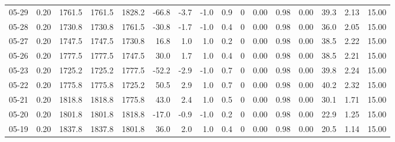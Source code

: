 \begin{threeparttable}
{\begin{tabular}{lrrrrrrrrrrrrrrr}
  05-29 &     0.20 & 1761.5 & 1761.5 & 1828.2 &      -66.8 &           -3.7 &                     -1.0 &                 0.9 &              0 &       0.00 &      0.98 &           0.00 &             39.3 &            2.13 &                  15.00 \\
  05-28 &     0.20 & 1730.8 & 1730.8 & 1761.5 &      -30.8 &           -1.7 &                     -1.0 &                 0.4 &              0 &       0.00 &      0.98 &           0.00 &             36.0 &            2.05 &                  15.00 \\
  05-27 &     0.20 & 1747.5 & 1747.5 & 1730.8 &       16.8 &            1.0 &                      1.0 &                 0.2 &              0 &       0.00 &      0.98 &           0.00 &             38.5 &            2.22 &                  15.00 \\
  05-26 &     0.20 & 1777.5 & 1777.5 & 1747.5 &       30.0 &            1.7 &                      1.0 &                 0.4 &              0 &       0.00 &      0.98 &           0.00 &             38.5 &            2.21 &                  15.00 \\
  05-23 &     0.20 & 1725.2 & 1725.2 & 1777.5 &      -52.2 &           -2.9 &                     -1.0 &                 0.7 &              0 &       0.00 &      0.98 &           0.00 &             39.8 &            2.24 &                  15.00 \\
  05-22 &     0.20 & 1775.8 & 1775.8 & 1725.2 &       50.5 &            2.9 &                      1.0 &                 0.7 &              0 &       0.00 &      0.98 &           0.00 &             40.2 &            2.32 &                  15.00 \\
  05-21 &     0.20 & 1818.8 & 1818.8 & 1775.8 &       43.0 &            2.4 &                      1.0 &                 0.5 &              0 &       0.00 &      0.98 &           0.00 &             30.1 &            1.71 &                  15.00 \\
  05-20 &     0.20 & 1801.8 & 1801.8 & 1818.8 &      -17.0 &           -0.9 &                     -1.0 &                 0.2 &              0 &       0.00 &      0.98 &           0.00 &             22.9 &            1.25 &                  15.00 \\
  05-19 &     0.20 & 1837.8 & 1837.8 & 1801.8 &       36.0 &            2.0 &                      1.0 &                 0.4 &              0 &       0.00 &      0.98 &           0.00 &             20.5 &            1.14 &                  15.00 \\

\end{tabular}}
\end{threeparttable}
